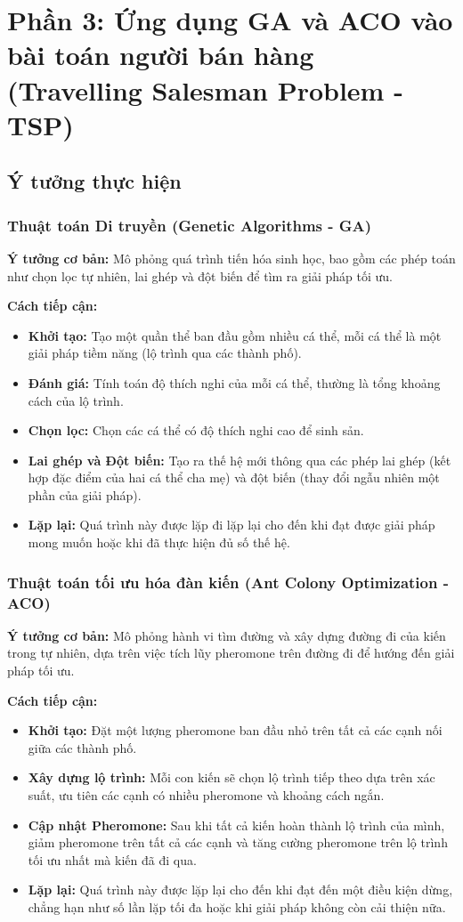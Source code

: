 \documentclass[14pt]{article}
\begin{document}
	\section{Phần 3: Ứng dụng GA và ACO vào bài toán người bán hàng (Travelling Salesman Problem - TSP)}
	\subsection{Ý tưởng thực hiện}
	
	\subsubsection{Thuật toán Di truyền (Genetic Algorithms - GA)}
	\textbf{Ý tưởng cơ bản:} Mô phỏng quá trình tiến hóa sinh học, bao gồm các phép toán như chọn lọc tự nhiên, lai ghép và đột biến để tìm ra giải pháp tối ưu.
	
	\textbf{Cách tiếp cận:}
	\begin{itemize}
		\item \textbf{Khởi tạo:} Tạo một quần thể ban đầu gồm nhiều cá thể, mỗi cá thể là một giải pháp tiềm năng (lộ trình qua các thành phố).
		\item \textbf{Đánh giá:} Tính toán độ thích nghi của mỗi cá thể, thường là tổng khoảng cách của lộ trình.
		\item \textbf{Chọn lọc:} Chọn các cá thể có độ thích nghi cao để sinh sản.
		\item \textbf{Lai ghép và Đột biến:} Tạo ra thế hệ mới thông qua các phép lai ghép (kết hợp đặc điểm của hai cá thể cha mẹ) và đột biến (thay đổi ngẫu nhiên một phần của giải pháp).
		\item \textbf{Lặp lại:} Quá trình này được lặp đi lặp lại cho đến khi đạt được giải pháp mong muốn hoặc khi đã thực hiện đủ số thế hệ.
	\end{itemize}
	
	\subsubsection{ Thuật toán tối ưu hóa đàn kiến (Ant Colony Optimization - ACO)}
	\textbf{Ý tưởng cơ bản:} Mô phỏng hành vi tìm đường và xây dựng đường đi của kiến trong tự nhiên, dựa trên việc tích lũy pheromone trên đường đi để hướng đến giải pháp tối ưu.
	
	\textbf{Cách tiếp cận:}
	\begin{itemize}
		\item \textbf{Khởi tạo:} Đặt một lượng pheromone ban đầu nhỏ trên tất cả các cạnh nối giữa các thành phố.
		\item \textbf{Xây dựng lộ trình:} Mỗi con kiến sẽ chọn lộ trình tiếp theo dựa trên xác suất, ưu tiên các cạnh có nhiều pheromone và khoảng cách ngắn.
		\item \textbf{Cập nhật Pheromone:} Sau khi tất cả kiến hoàn thành lộ trình của mình, giảm pheromone trên tất cả các cạnh và tăng cường pheromone trên lộ trình tối ưu nhất mà kiến đã đi qua.
		\item \textbf{Lặp lại:} Quá trình này được lặp lại cho đến khi đạt đến một điều kiện dừng, chẳng hạn như số lần lặp tối đa hoặc khi giải pháp không còn cải thiện nữa.
	\end{itemize}
\end{document}
